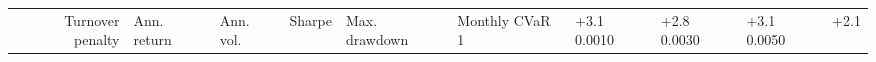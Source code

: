 \begin{tabular}{rlllllll}
\toprule
Turnover penalty & Ann. return & Ann. vol. & Sharpe & Max. drawdown & Monthly CVaR 1%
 & +3.1%
0.0010 & +2.8%
0.0030 & +3.1%
0.0050 & +2.1%
\bottomrule
\end{tabular}
